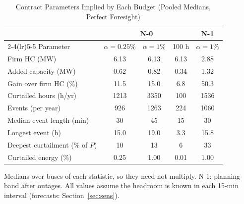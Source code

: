 \begin{table}[t]
\centering
\caption{Contract Parameters Implied by Each Budget (Pooled Medians, Perfect Foresight)}
\label{tab:contract}
\setlength{\tabcolsep}{3pt}
\begin{tabular}{lcccc}
\toprule
 & \multicolumn{3}{c}{N-0} & N-1 \\
\cmidrule(lr){2-4}\cmidrule(lr){5-5}
Parameter & $\alpha=0.25\%$ & $\alpha=1\%$ & 100 h & $\alpha=1\%$ \\
\midrule
Firm HC (MW) & 6.13 & 6.13 & 6.13 & 2.88 \\
Added capacity (MW) & 0.62 & 0.82 & 0.34 & 1.32 \\
Gain over firm HC (\%) & 11.5 & 15.0 & 6.8 & 50.3 \\
Curtailed hours (h/yr) & 1213 & 3350 & 100 & 1536 \\
Events (per year) & 926 & 1263 & 224 & 1060 \\
Median event length (min) & 30 & 45 & 15 & 30 \\
Longest event (h) & 15.0 & 19.0 & 3.3 & 15.8 \\
Deepest curtailment (\% of $P$) & 10 & 13 & 6 & 33 \\
Curtailed energy (\%) & 0.25 & 1.00 & 0.01 & 1.00 \\
\bottomrule
\end{tabular}
\vspace{2pt}
\begin{minipage}{\columnwidth}\footnotesize Medians over buses of each statistic, so they need not multiply. N-1: planning band after outages. All values assume the headroom is known in each 15-min interval (forecasts: Section~\ref{sec:sens}).\end{minipage}
\end{table}
